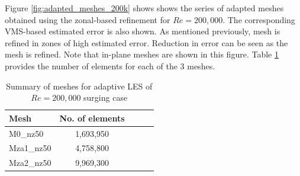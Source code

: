
Figure \ref{fig:adapted_meshes_200k} shows 
shows the series of adapted meshes obtained using the zonal-based refinement for $Re=200,000$. The corresponding VMS-based estimated error is also shown. As mentioned previously, mesh is refined in zones of high estimated error. 
Reduction in error can be seen as the mesh is refined.
Note that in-plane meshes are shown in this figure.
Table \ref{table:adapt_mesh_details_Re200k} provides the number of elements for each of the 3 meshes.

\begin{table}[H]
	\centering
	\caption{Summary of meshes for adaptive LES of $Re=200,000$ surging case}
	\label{table:adapt_mesh_details_Re200k}
	\begin{tabular}{|l|c|c|c|c|}
		\hline
		Mesh   & No. of elements \\
		\hline
		M0\_nz50	& 1,693,950 \\
		\hline
		Mza1\_nz50	& 4,758,800 \\
		\hline		
		Mza2\_nz50  &  9,969,300 \\
		\hline
	\end{tabular}
\end{table}


